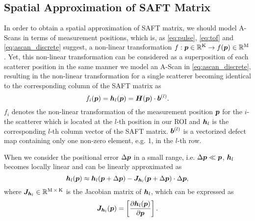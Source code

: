 \subsection{Spatial Approximation of SAFT Matrix} \label{sec:saft_approx}
In order to obtain a spatial approximation of SAFT matrix, we should model A-Scans in terms of measurement positions, which is, as \eqref{eq:pulse}, \eqref{eq:tof} and \eqref{eq:ascan_discrete} suggest, a non-linear transformation $f: \bm{p} \in {\mathbb{R}}^{\operatorname{K}} \rightarrow f (\bm{p}) \in {\mathbb{R}}^{\operatorname{M}}$. Yet, this non-linear transformation can be considered as a superposition of each scatterer position in the same manner we model an A-Scan in \eqref{eq:ascan_discrete}, resulting in the non-linear transformation for a single scatterer becoming identical to the corresponding column of the SAFT matrix as
\begin{equation} \label{eq:ascan_model}
f_{i} (\pp) = \SAFTcol (\pp) = \SAFTp \cdot \defect^{(l)}.
\end{equation}
$f_{i}$ denotes the non-linear transformation of the measurement position $\bm{p}$ for the $i$-the scatterer which is located at the $l$-th position in our ROI and $\bm{h}_{l}$ is the corresponding $l$-th column vector of the SAFT matrix. $\bm{b}^{(l)}$ is a vectorized defect map containing only one non-zero element, e.g. 1, in the $l$-th row. \par

When we consider the positional error $\Delta \bm{p}$ in a small range, i.e. $\Delta \bm{p} \ll \bm{p}$, $\bm{h}_{l}$ becomes locally linear and can be linearly approximated as 
\begin{equation} \label{eq:local_linearity}
\SAFTcol (\pp) \approx \SAFTcol (\pp + \ppdelta) - \Jacobianpartial (\pp + \ppdelta) \cdot \ppdelta, 
\end{equation}
where $\bm{J}_{\bm{h}_{l}} \in {\mathbb{R}}^{\operatorname{M} \times \operatorname{K}} $ is the Jacobian matrix of $\bm{h}_{l}$, which can be expressed as
\begin{equation} \label{eq:jacobian_partial}
\Jacobianpartial (\pp) =  \left[ \frac{\partial \SAFTcol (\pp)}{\partial \pp} \right] .
\end{equation} \par

